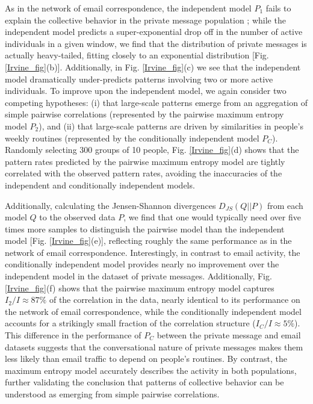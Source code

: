 \documentclass[aps,reprint,superscriptaddress,amsmath,amssymb,longbibliography]{revtex4-1}
\begin{document}
As in the network of email correspondence, the independent model $P_1$ fails to explain the collective behavior in the private message population \cite{Rasch-01,Karagiannis-01,Haight-01,Gerlough-01}; while the independent model predicts a super-exponential drop off in the number of active individuals in a given window, we find that the distribution of private messages is actually heavy-tailed, fitting closely to an exponential distribution [Fig. \ref{Irvine_fig}(b)]. Additionally, in Fig. \ref{Irvine_fig}(c) we see that the independent model dramatically under-predicts patterns involving two or more active individuals. To improve upon the independent model, we again consider two competing hypotheses: (i) that large-scale patterns emerge from an aggregation of simple pairwise correlations (represented by the pairwise maximum entropy model $P_2$), and (ii) that large-scale patterns are driven by similarities in people's weekly routines (represented by the conditionally independent model $P_C$). Randomly selecting 300 groups of 10 people, Fig. \ref{Irvine_fig}(d) shows that the pattern rates predicted by the pairwise maximum entropy model are tightly correlated with the observed pattern rates, avoiding the inaccuracies of the independent and conditionally independent models.

Additionally, calculating the Jensen-Shannon divergences $D_{JS}(Q||P)$ from each model $Q$ to the observed data $P$, we find that one would typically need over five times more samples to distinguish the pairwise model than the independent model [Fig. \ref{Irvine_fig}(e)], reflecting roughly the same performance as in the network of email correspondence. Interestingly, in contrast to email activity, the conditionally independent model provides nearly no improvement over the independent model in the dataset of private messages. Additionally, Fig. \ref{Irvine_fig}(f) shows that the pairwise maximum entropy model captures $I_2/I \approx 87\%$ of the correlation in the data, nearly identical to its performance on the network of email correspondence, while the conditionally independent model accounts for a strikingly small fraction of the correlation structure ($I_C/I \approx 5\%$). This difference in the performance of $P_C$ between the private message and email datasets suggests that the conversational nature of private messages makes them less likely than email traffic to depend on people's routines. By contrast, the maximum entropy model accurately describes the activity in both populations, further validating the conclusion that patterns of collective behavior can be understood as emerging from simple pairwise correlations.
\end{document}
